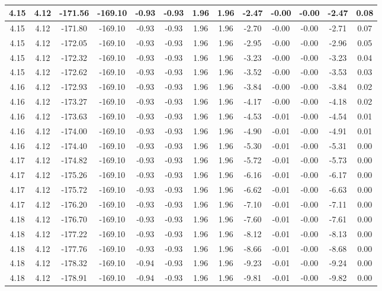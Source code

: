 \begin{table}[htbp]
\begin{adjustbox}{angle=90}
\begin{tabular}{|c|c|c|c|c|c|c|c|c|c|c|c|c|}
 4.15 & 4.12 & -171.56 & -169.10 & -0.93 & -0.93 & 1.96 & 1.96 & -2.47 & -0.00 & -0.00 & -2.47 & 0.08\\ \hline
 4.15 & 4.12 & -171.80 & -169.10 & -0.93 & -0.93 & 1.96 & 1.96 & -2.70 & -0.00 & -0.00 & -2.71 & 0.07\\ \hline
 4.15 & 4.12 & -172.05 & -169.10 & -0.93 & -0.93 & 1.96 & 1.96 & -2.95 & -0.00 & -0.00 & -2.96 & 0.05\\ \hline
 4.15 & 4.12 & -172.32 & -169.10 & -0.93 & -0.93 & 1.96 & 1.96 & -3.23 & -0.00 & -0.00 & -3.23 & 0.04\\ \hline
 4.15 & 4.12 & -172.62 & -169.10 & -0.93 & -0.93 & 1.96 & 1.96 & -3.52 & -0.00 & -0.00 & -3.53 & 0.03\\ \hline
 4.16 & 4.12 & -172.93 & -169.10 & -0.93 & -0.93 & 1.96 & 1.96 & -3.84 & -0.00 & -0.00 & -3.84 & 0.02\\ \hline
 4.16 & 4.12 & -173.27 & -169.10 & -0.93 & -0.93 & 1.96 & 1.96 & -4.17 & -0.00 & -0.00 & -4.18 & 0.02\\ \hline
 4.16 & 4.12 & -173.63 & -169.10 & -0.93 & -0.93 & 1.96 & 1.96 & -4.53 & -0.01 & -0.00 & -4.54 & 0.01\\ \hline
 4.16 & 4.12 & -174.00 & -169.10 & -0.93 & -0.93 & 1.96 & 1.96 & -4.90 & -0.01 & -0.00 & -4.91 & 0.01\\ \hline
 4.16 & 4.12 & -174.40 & -169.10 & -0.93 & -0.93 & 1.96 & 1.96 & -5.30 & -0.01 & -0.00 & -5.31 & 0.00\\ \hline
 4.17 & 4.12 & -174.82 & -169.10 & -0.93 & -0.93 & 1.96 & 1.96 & -5.72 & -0.01 & -0.00 & -5.73 & 0.00\\ \hline
 4.17 & 4.12 & -175.26 & -169.10 & -0.93 & -0.93 & 1.96 & 1.96 & -6.16 & -0.01 & -0.00 & -6.17 & 0.00\\ \hline
 4.17 & 4.12 & -175.72 & -169.10 & -0.93 & -0.93 & 1.96 & 1.96 & -6.62 & -0.01 & -0.00 & -6.63 & 0.00\\ \hline
 4.17 & 4.12 & -176.20 & -169.10 & -0.93 & -0.93 & 1.96 & 1.96 & -7.10 & -0.01 & -0.00 & -7.11 & 0.00\\ \hline
 4.18 & 4.12 & -176.70 & -169.10 & -0.93 & -0.93 & 1.96 & 1.96 & -7.60 & -0.01 & -0.00 & -7.61 & 0.00\\ \hline
 4.18 & 4.12 & -177.22 & -169.10 & -0.93 & -0.93 & 1.96 & 1.96 & -8.12 & -0.01 & -0.00 & -8.13 & 0.00\\ \hline
 4.18 & 4.12 & -177.76 & -169.10 & -0.93 & -0.93 & 1.96 & 1.96 & -8.66 & -0.01 & -0.00 & -8.68 & 0.00\\ \hline
 4.18 & 4.12 & -178.32 & -169.10 & -0.94 & -0.93 & 1.96 & 1.96 & -9.23 & -0.01 & -0.00 & -9.24 & 0.00\\ \hline
 4.18 & 4.12 & -178.91 & -169.10 & -0.94 & -0.93 & 1.96 & 1.96 & -9.81 & -0.01 & -0.00 & -9.82 & 0.00\\ \hline
            \end{tabular}
        \end{adjustbox}
        \caption{}
        \label{}
    \end{table}
    